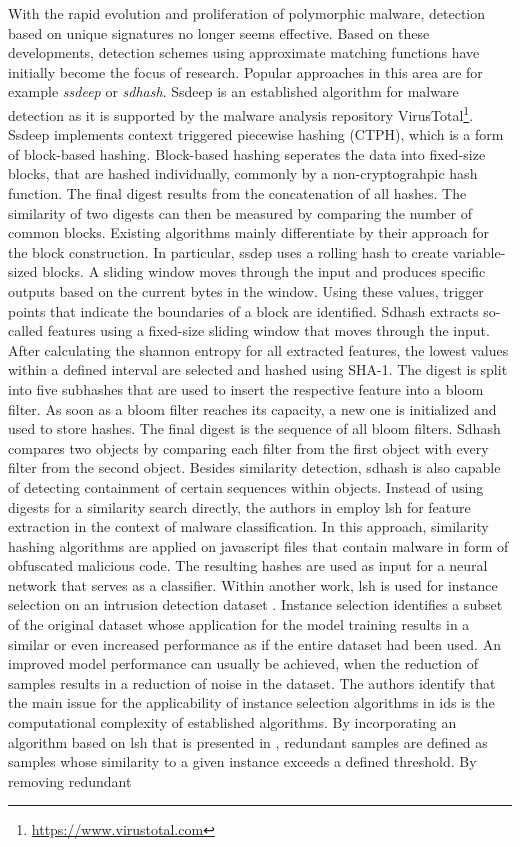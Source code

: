 \documentclass[../../main.tex]{subfiles}
\begin{document}
With the rapid evolution and proliferation of polymorphic malware, detection based on unique signatures no longer seems effective. Based on these developments, detection schemes using approximate matching functions have initially become the focus of research. Popular approaches in this area are for example \textit{ssdeep} or \textit{sdhash}. Ssdeep \cite{kornblum_identifying_2006} is an established algorithm for malware detection as it is supported by the malware analysis repository VirusTotal\footnote{\url{https://www.virustotal.com}}. Ssdeep implements context triggered piecewise hashing (CTPH), which is a form of block-based hashing. Block-based hashing seperates the data into fixed-size blocks, that are hashed individually, commonly by a non-cryptograhpic hash function. The final digest results from the concatenation of all hashes. The similarity of two digests can then be measured by comparing the number of common blocks. Existing algorithms mainly differentiate by their approach for the block construction. In particular, ssdep uses a rolling hash to create variable-sized blocks. A sliding window moves through the input and produces specific outputs based on the current bytes in the window. Using these values, trigger points that indicate the boundaries of a block are identified. Sdhash \cite{chow_data_2010} extracts so-called features using a fixed-size sliding window that moves through the input. After calculating the shannon entropy for all extracted features, the lowest values within a defined interval are selected and hashed using SHA-1. The digest is split into five subhashes that are used to insert the respective feature into a bloom filter. As soon as a bloom filter reaches its capacity, a new one is initialized and used to store hashes. The final digest is the sequence of all bloom filters. Sdhash compares two objects by comparing each filter from the first object with every filter from the second object. Besides similarity detection, sdhash is also capable of detecting containment of certain sequences within objects. Instead of using digests for a similarity search directly, the authors in \cite{ludwig_friborg_malware_2019} employ \gls{lsh} for feature extraction in the context of malware classification. In this approach, similarity hashing algorithms are applied on javascript files that contain malware in form of obfuscated malicious code. The resulting hashes are used as input for a neural network that serves as a classifier. Within another work, \gls{lsh} is used for instance selection on an intrusion detection dataset \cite{baldini2021intrusion}. Instance selection identifies a subset of the original dataset whose application for the model training results in a similar or even increased performance as if the entire dataset had been used. An improved model performance can usually be achieved, when the reduction of samples results in a reduction of noise in the dataset. The authors identify that the main issue for the applicability of instance selection algorithms in \gls{ids} is the computational complexity of established algorithms. By incorporating an algorithm based on \gls{lsh} that is presented in \cite{aslani2020fast}, redundant samples are defined as samples whose similarity to a given instance exceeds a defined threshold. By removing redundant 
\end{document}
